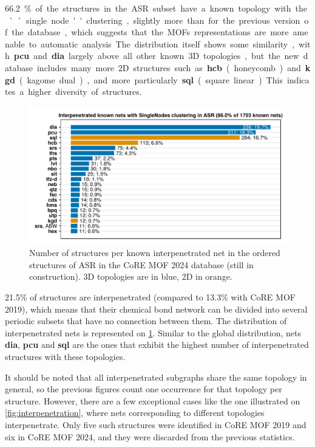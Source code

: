 \documentclass[main.tex]{subfiles}
\begin{document}
\qty{66.2}\% of the structures in the ASR subset have a known topology with the ``single node'' clustering, slightly more than for the previous version of the database, which suggests that the MOFs representations are more amenable to automatic analysis. The distribution itself shows some similarity, with \textbf{pcu} and \textbf{dia} largely above all other known 3D topologies, but the new database includes many more 2D structures such as \textbf{hcb} (honeycomb) and \textbf{kgd} (kagome dual), and more particularly \textbf{sql} (square linear). This indicates a higher diversity of structures.

\begin{figure}
	\centering
	\includegraphics[width=\linewidth]{figures/topology/CoREMOF2024_interpenetration.pdf}
	\caption{Number of structures per known interpenetrated net in the ordered structures of ASR in the CoRE MOF 2024 database (still in construction). 3D topologies are in blue, 2D in orange.}\label{fig:CoREMOF2024_interpenetration}
\end{figure}

\num{21.5}\% of structures are interpenetrated (compared to \num{13.3}\% with CoRE MOF 2019), which means that their chemical bond network can be divided into several periodic subsets that have no connection between them. The distribution of interpenetrated nets is represented on \cref{fig:CoREMOF2024_interpenetration}. Similar to the global distribution, nets \textbf{dia}, \textbf{pcu} and \textbf{sql} are the ones that exhibit the highest number of interpenetrated structures with these topologies.

It should be noted that all interpenetrated subgraphs share the same topology in general, so the previous figures count one occurrence for that topology per structure. However, there are a few exceptional cases like the one illustrated on \cref{fig:interpenetration}, where nets corresponding to different topologies interpenetrate. Only five such structures were identified in CoRE MOF 2019 and six in CoRE MOF 2024, and they were discarded from the previous statistics.
\end{document}
